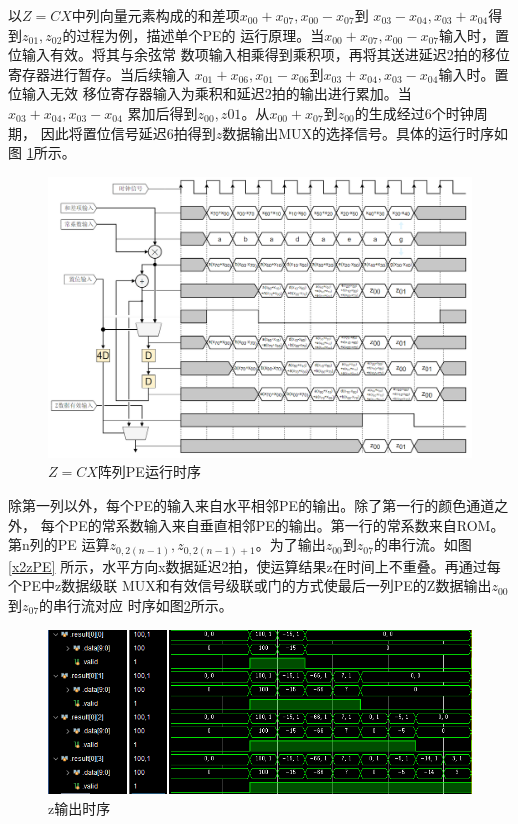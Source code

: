 \documentclass{article}
\numberwithin {equation}{section}
\begin{document}
\begin{spacing}{1.25}
        以$Z=CX$中列向量元素构成的和差项$x_{00}+x_{07},x_{00}-x_{07}$到
        $x_{03}-x_{04},x_{03}+x_{04}$得到$z_{01},z_{02}$的过程为例，描述单个PE的
        运行原理。当$x_{00}+x_{07},x_{00}-x_{07}$输入时，置位输入有效。将其与余弦常
        数项输入相乘得到乘积项，再将其送进延迟2拍的移位寄存器进行暂存。当后续输入
        $x_{01}+x_{06},x_{01}-x_{06}$到$x_{03}+x_{04},x_{03}-x_{04}$输入时。置位输入无效
        移位寄存器输入为乘积和延迟2拍的输出进行累加。当$x_{03}+x_{04},x_{03}-x_{04}$
        累加后得到$z_{00},z{01}$。从$x_{00}+x_{07}$到$z_{00}$的生成经过6个时钟周期，
        因此将置位信号延迟6拍得到$z$数据输出MUX的选择信号。具体的运行时序如图
        \ref{PE运行时序}所示。
        \begin{figure}[H]
          \centering
          \includegraphics[scale=0.5]{./pictures/PE时序.png}
          \caption{$Z=CX$阵列PE运行时序}
          \label{PE运行时序}
        \end{figure}
        除第一列以外，每个PE的输入来自水平相邻PE的输出。除了第一行的颜色通道之外，
        每个PE的常系数输入来自垂直相邻PE的输出。第一行的常系数来自ROM。第n列的PE
        运算$z_{0,2(n-1)},z_{0,2(n-1)+1}$。为了输出$z_{00}$到$z_{07}$的串行流。如图\ref{x2zPE}
        所示，水平方向x数据延迟2拍，使运算结果z在时间上不重叠。再通过每个PE中z数据级联
        MUX和有效信号级联或门的方式使最后一列PE的Z数据输出$z_{00}$到$z_{07}$的串行流对应
        时序如图\ref{z输出时序}所示。
        \begin{figure}[H]
          \centering
          \includegraphics[scale=0.8]{./pictures/z输出时序.png}
          \caption{z输出时序}
          \label{z输出时序}
        \end{figure}
        

\end{spacing}
\end{document}
